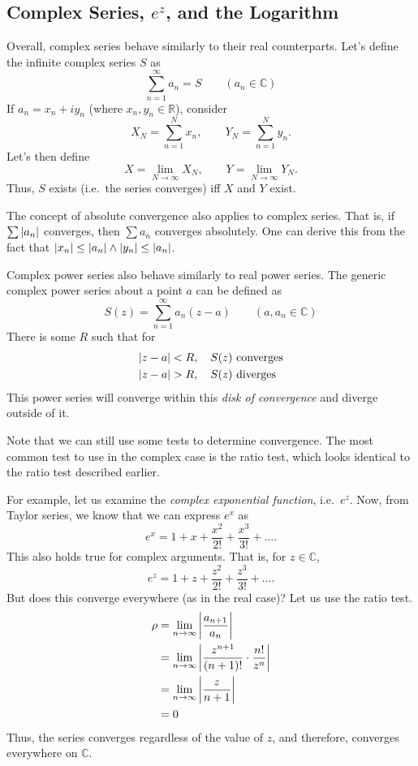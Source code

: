 \documentclass[10pt]{scrartcl}
\numberwithin{equation}{subsection}
\theoremstyle{definition}
\theoremstyle{remark}
\newcommand{\Reals}{\mathbb{R}}
\newcommand{\Complex}{\mathbb{C}}
\begin{document}
\subsection{Complex Series, $e^z$, and the Logarithm}
Overall, complex series behave similarly to their real counterparts.
Let's define the infinite complex series $S$ as 
\begin{equation}
	\sum_{n=1}^{\infty} a_n = S \qquad (a_n \in \Complex)
\end{equation}
If $a_n = x_n + i y_n$ (where $x_n, y_n \in \Reals$), consider
\[
	X_N = \sum_{n=1}^{N} x_n, \qquad Y_N = \sum_{n=1}^{N} y_n.
\]
Let's then define
\[
	X = \lim_{N \to \infty} X_N, \qquad Y = \lim_{N \to \infty} Y_N.
\]
Thus, $S$ exists (i.e.\ the series converges) iff $X$ and $Y$ exist.

The concept of absolute convergence also applies to complex series.
That is, if $\sum \abs{a_n}$ converges, then $ \sum a_n$ converges absolutely. 
One can derive this from the fact that $\abs{x_n} \leq \abs{a_n} \wedge
\abs{y_n} \leq \abs{a_n}$.

Complex power series also behave similarly to real power series. The generic
complex power series about a point $a$ can be defined as
\begin{equation}
	S(z) = \sum_{n=1}^{\infty} a_n (z - a) \qquad (a, a_n \in \Complex)
\end{equation}
There is some $R$ such that for
\begin{align*}
	\abs{z-a} &< R, \quad S(z)~\text{converges} \\
	\abs{z-a} &> R, \quad S(z)~\text{diverges} \\
\end{align*}
This power series will converge within this \textit{disk of convergence} and
diverge outside of it.

Note that we can still use some tests to determine convergence. The most common
test to use in the complex case is the ratio test, which looks identical to the
ratio test described earlier.

For example, let us examine the \textit{complex exponential function}, i.e.\
$e^z$. Now, from Taylor series, we know that we can express $e^x$ as
\[
	e^x = 1 + x + \frac{x^2}{2!} + \frac{x^3}{3!} + \ldots.
\]
This also holds true for complex arguments. That is, for $z \in \Complex$,
\begin{equation}
	e^z = 1 + z + \frac{z^2}{2!} + \frac{z^3}{3!} + \ldots.
\end{equation}
But does this converge everywhere (as in the real case)? Let us use the ratio
test.
\begin{align*}
	\rho &= \lim_{n \to \infty} \abs{\frac{a_{n+1}}{a_n}} \\
      &= \lim_{n \to \infty} \abs{\frac{z^{n+1}}{(n+1)!} \cdot \frac{n!}{z^n}} \\
      &= \lim_{n \to \infty} \abs{\frac{z}{n+1}} \\
      &= 0
\end{align*}
Thus, the series converges regardless of the value of $z$, 
and therefore, converges everywhere on $\Complex$.
\end{document}
